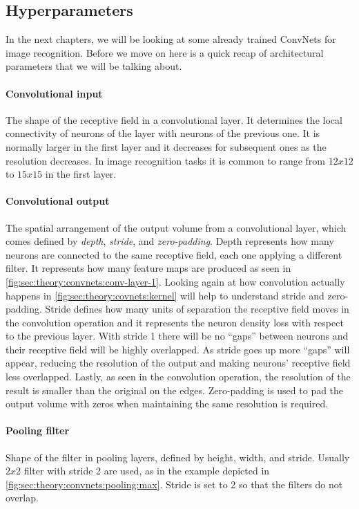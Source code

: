 \subsection{Hyperparameters}
\label{sub:theory:convnets:achitecture}

In the next chapters, we will be looking at some already trained ConvNets for image recognition.
Before we move on here is a quick recap of architectural parameters that we will be talking about.

\paragraph{Convolutional input}
The shape of the receptive field in a convolutional layer.
It determines the local connectivity of neurons of the layer with neurons of the previous one.
It is normally larger in the first layer and it decreases for subsequent ones as the resolution decreases.
In image recognition tasks it is common to range from $12x12$ to $15x15$ in the first layer.

\paragraph{Convolutional output}
The spatial arrangement of the output volume from a convolutional layer, which comes defined by \emph{depth}, \emph{stride}, and \emph{zero-padding}.
Depth represents how many neurons are connected to the same receptive field, each one applying a different filter.
It represents how many feature maps are produced as seen in \autoref{fig:sec:theory:convnets:conv-layer-1}.
Looking again at how convolution actually happens in \autoref{fig:sec:theory:covnets:kernel} will help to understand stride and zero-padding.
Stride defines how many units of separation the receptive field moves in the convolution operation and it represents the neuron density loss with respect to the previous layer.
With stride 1 there will be no ``gaps'' between neurons and their receptive field will be highly overlapped.
As stride goes up more ``gaps'' will appear, reducing the resolution of the output and making neurons' receptive field less overlapped.
Lastly, as seen in the convolution operation, the resolution of the result is smaller than the original on the edges.
Zero-padding is used to pad the output volume with zeros when maintaining the same resolution is required.

\paragraph{Pooling filter}
Shape of the filter in pooling layers, defined by height, width, and stride.
Usually $2x2$ filter with stride 2 are used, as in the example depicted in \autoref{fig:sec:theory:convnets:pooling:max}.
Stride is set to 2 so that the filters do not overlap.
